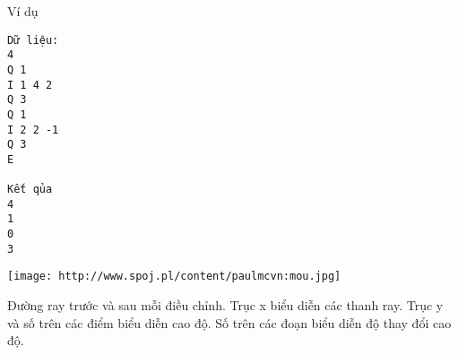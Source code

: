 Ví dụ
\begin{verbatim}
Dữ liệu:
4
Q 1
I 1 4 2
Q 3
Q 1
I 2 2 -1
Q 3
E

Kết qủa
4
1
0
3
\end{verbatim}


\texttt{[image: http://www.spoj.pl/content/paulmcvn:mou.jpg]}

   Đường ray trước và sau mỗi điều chỉnh. Trục x biểu diễn các thanh ray. Trục y và số trên các điểm biểu diễn cao độ.   Số trên các đoạn biểu diễn độ thay đổi cao độ.